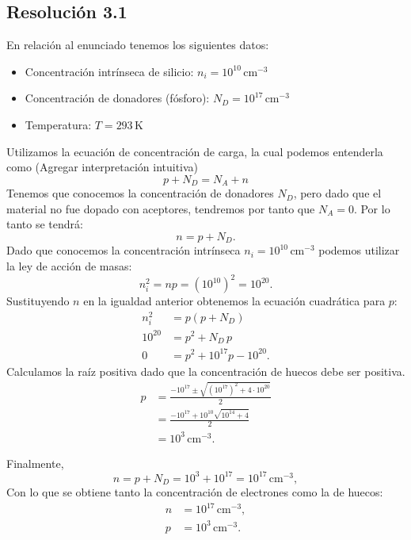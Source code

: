 \documentclass[
  11pt,
  letterpaper,
   addpoints,
  ]{exam}
\begin{document}
\begin{questions}
\begin{solution}
    \subsection*{Resolución 3.1}
    En relación al enunciado tenemos los siguientes datos:
    \begin{itemize}
        \item Concentración intrínseca de silicio: $n_i=10^{10}\,\mathrm{cm^{-3}}$
        \item Concentración de donadores (fósforo): $N_D=10^{17}\,\mathrm{cm^{-3}}$
        \item Temperatura: $T=293\,$K
    \end{itemize}
    Utilizamos la ecuación de concentración de carga, la cual podemos entenderla como (Agregar interpretación intuitiva)
    \begin{equation}
        p + N_D = N_A + n
    \end{equation}
    Tenemos que conocemos la concentración de donadores $N_D$, pero dado que el material no fue dopado con aceptores, tendremos por tanto que $N_{A} = 0$. Por lo tanto se tendrá:
    \begin{equation}
        n = p + N_D.
    \end{equation}
    Dado que conocemos la concentración intrínseca $n_i=10^{10}\,\mathrm{cm^{-3}}$ podemos utilizar la ley de acción de masas:
    \begin{equation}
        n_i^2 = np = (10^{10})^2 = 10^{20}.
    \end{equation}
    Sustituyendo $n$ en la igualdad anterior obtenemos la ecuación cuadrática para $p$:
    \begin{align}
        n_i^2 &= p(p+N_D) \\
        10^{20} &= p^2 + N_D\,p \\
       0 &=  p^2 + 10^{17}p - 10^{20}.
    \end{align}
    Calculamos la raíz positiva dado que la concentración de huecos debe ser positiva.
    \begin{align}
        p &= \frac{-10^{17} \pm \sqrt{(10^{17})^2 + 4\cdot10^{20}}}{2} \\
          &= \frac{-10^{17} + 10^{10}\sqrt{10^{14}+4}}{2}\\
          &=10^{3}\,\mathrm{cm^{-3}}.
    \end{align}

    Finalmente,
    \begin{equation}
        n = p + N_D = 10^{3} + 10^{17} = 10^{17}\,\mathrm{cm^{-3}},
    \end{equation}
Con lo que se obtiene tanto la concentración de electrones como la de huecos:
\begin{align}
    n &=10^{17}\,\mathrm{cm^{-3}}, \\
    p &= 10^{3}\,\mathrm{cm^{-3}}.
\end{align}

\end{solution}
\end{questions}
\end{document}
